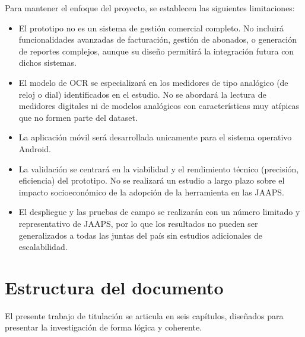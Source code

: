 Para mantener el enfoque del proyecto, se establecen las siguientes limitaciones:
\begin{itemize}
\item El prototipo no es un sistema de gestión comercial completo. No incluirá funcionalidades avanzadas de facturación, gestión de abonados, o generación de reportes complejos, aunque su diseño permitirá la integración futura con dichos sistemas.
\item El modelo de OCR se especializará en los medidores de tipo analógico (de reloj o dial) identificados en el estudio. No se abordará la lectura de medidores digitales ni de modelos analógicos con características muy atípicas que no formen parte del dataset.
\item La aplicación móvil será desarrollada unicamente para el sistema operativo Android.
\item La validación se centrará en la viabilidad y el rendimiento técnico (precisión, eficiencia) del prototipo. No se realizará un estudio a largo plazo sobre el impacto socioeconómico de la adopción de la herramienta en las JAAPS.
\item El despliegue y las pruebas de campo se realizarán con un número limitado y representativo de JAAPS, por lo que los resultados no pueden ser generalizados a todas las juntas del país sin estudios adicionales de escalabilidad.
\end{itemize}

\section{Estructura del documento}
\label{sec:document_structure}

El presente trabajo de titulación se articula en seis capítulos, diseñados para presentar la investigación de forma lógica y coherente.

